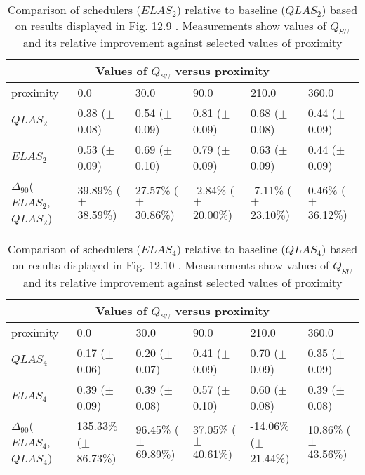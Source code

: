 \clearpage
\begin{landscape}
\begin{table}[h]
\begin{center}
\begin{tabular}{llllll}
\toprule
\multicolumn{6}{c}{Values of $Q_{SU}$ versus proximity}\\
\midrule
proximity & 0.0 & 30.0 & 90.0 & 210.0 & 360.0\\
\midrule
$QLAS_2$ &  0.38 ($\pm$0.08) &  0.54 ($\pm$0.09) &  0.81 ($\pm$0.09) &  0.68 ($\pm$0.08) &  0.44 ($\pm$0.09)\\
\midrule
$ELAS_2$ &  0.53 ($\pm$0.09) &  0.69 ($\pm$0.10) &  0.79 ($\pm$0.09) &  0.63 ($\pm$0.09) &  0.44 ($\pm$0.09)\\
$\Delta_{90}$($ELAS_2$,$QLAS_2$) & 39.89\% ($\pm$38.59\%) & 27.57\% ($\pm$30.86\%) & -2.84\% ($\pm$20.00\%) & -7.11\% ($\pm$23.10\%) & 0.46\% ($\pm$36.12\%)\\
\bottomrule
\end{tabular}
\end{center}
\caption[Comparison of $Q_{SU}$ versus proximity for $ELAS_2$ relative to $QLAS_2$.]{Comparison of schedulers ($ELAS_2$) relative to baseline ($QLAS_2$) based on results displayed in Fig. 12.9 . Measurements show values of $Q_{SU}$ and its relative improvement against selected values of proximity}
\label{b:f129}
\end{table}
\end{landscape}


\clearpage
\begin{landscape}
\begin{table}[h]
\begin{center}
\begin{tabular}{llllll}
\toprule
\multicolumn{6}{c}{Values of $Q_{SU}$ versus proximity}\\
\midrule
proximity & 0.0 & 30.0 & 90.0 & 210.0 & 360.0\\
\midrule
$QLAS_4$ &  0.17 ($\pm$0.06) &  0.20 ($\pm$0.07) &  0.41 ($\pm$0.09) &  0.70 ($\pm$0.09) &  0.35 ($\pm$0.09)\\
\midrule
$ELAS_4$ &  0.39 ($\pm$0.09) &  0.39 ($\pm$0.08) &  0.57 ($\pm$0.10) &  0.60 ($\pm$0.08) &  0.39 ($\pm$0.08)\\
$\Delta_{90}$($ELAS_4$,$QLAS_4$) & 135.33\% ($\pm$86.73\%) & 96.45\% ($\pm$69.89\%) & 37.05\% ($\pm$40.61\%) & -14.06\% ($\pm$21.44\%) & 10.86\% ($\pm$43.56\%)\\
\bottomrule
\end{tabular}
\end{center}
\caption[Comparison of $Q_{SU}$ versus proximity for $ELAS_4$ relative to $QLAS_4$.]{Comparison of schedulers ($ELAS_4$) relative to baseline ($QLAS_4$) based on results displayed in Fig. 12.10 . Measurements show values of $Q_{SU}$ and its relative improvement against selected values of proximity}
\label{b:f1210}
\end{table}
\end{landscape}


